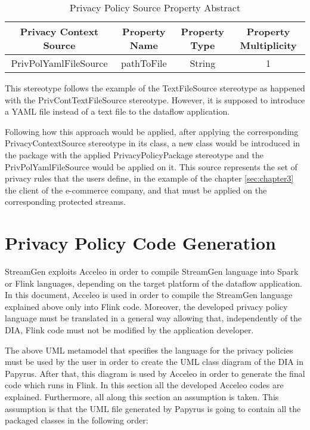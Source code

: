 \begin{table}[h!]
\centering
	\begin{tabular}{||c|c|c|c||} 
	\hline\hline
	Privacy Context Source & Property Name & Property Type & Property Multiplicity \\ [1ex] 
	\hline\hline
	PrivPolYamlFileSource & pathToFile & String & 1 \\
	\hline\hline
	\end{tabular}
\caption{Privacy Policy Source Property Abstract}
\label{Privacy Policy Source Property Abstract}
\end{table}

This stereotype follows the example of the TextFileSource stereotype as happened with the PrivContTextFileSource stereotype. However, it is supposed to introduce a YAML file instead of a text file to the dataflow application.

Following how this approach would be applied, after applying the corresponding PrivacyContextSource stereotype in its class, a new class would be introduced in the package with the applied PrivacyPolicyPackage stereotype and the PrivPolYamlFileSource would be applied on it. This source represents the set of privacy rules that the users define, in the example of the chapter \ref{sec:chapter3} the client of the e-commerce company, and that must be applied on the corresponding protected streams.

\section{Privacy Policy Code Generation}

StreamGen exploits Acceleo in order to compile StreamGen language into Spark or Flink languages, depending on the target platform of the dataflow application. In this document, Acceleo is used in order to compile the StreamGen language explained above only into Flink code. Moreover, the developed privacy policy language must be translated in a general way allowing that, independently of the DIA, Flink code must not be modified by the application developer.

The above UML metamodel that specifies the language for the privacy policies must be used by the user in order to create the UML class diagram of the DIA in Papyrus. After that, this diagram is used by Acceleo in order to generate the final code which runs in Flink. In this section all the developed Acceleo codes are explained. Furthermore, all along this section an assumption is taken. This assumption is that the UML file generated by Papyrus is going to contain all the packaged classes in the following order:

